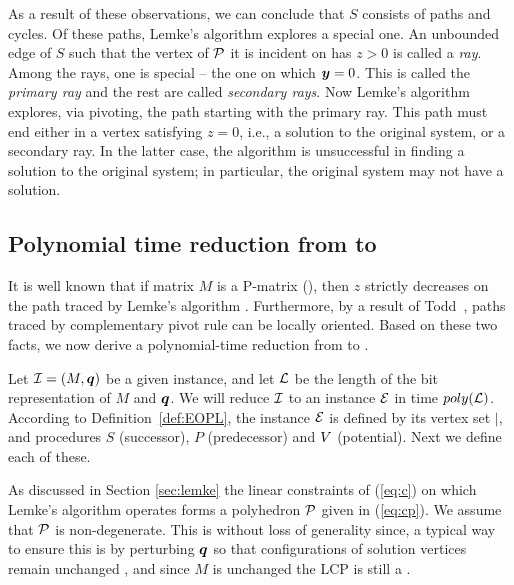 As a result of these observations, we can conclude that $S$ consists of paths and cycles.  Of these paths, Lemke's algorithm
explores a special one.  An unbounded edge of $S$ such that the vertex of $\mbox{${\mathcal P}$}$ it is incident on has $z > 0$ is called a
{\em ray}.  Among the rays, one is special -- the one on which $\mbox{\boldmath $y$} = 0$. This is called the {\em primary ray} and the rest
are called {\em secondary rays}. Now Lemke's algorithm explores, via pivoting, the path starting with the primary ray. This
path must end either in a vertex satisfying $z = 0$, i.e., a solution to the original system, or a secondary ray. In the
latter case, the algorithm is unsuccessful in finding a solution to the original system; in particular, the original system
may not have a solution.  

\subsection{Polynomial time reduction from \PLCP to \EOPL}

It is well known that if matrix $M$ is a P-matrix (\PLCP), then $z$ strictly
decreases on the path traced by Lemke's algorithm \cite{cottle2009linear}.
Furthermore, by a result of Todd~\cite[Section 5]{todd1976orientation}, paths traced by
complementary pivot rule can be locally oriented.  Based on these two facts, 
we now derive a polynomial-time reduction from \PLCP to \EOPL.

Let $\mbox{${\mathcal I}$}=(M,\mbox{\boldmath $q$})$ be a given \PLCP instance, and let $\mbox{${\mathcal L}$}$ be the length of the 
bit representation of $M$ and $\mbox{\boldmath $q$}$. 
We will reduce $\mbox{${\mathcal I}$}$ to an \EOPL instance $\mbox{${\mathcal E}$}$ in time $poly(\mbox{${\mathcal L}$})$. 
According to Definition~\ref{def:EOPL}, the instance $\mbox{${\mathcal E}$}$ is defined 
by its vertex set $\vert$, and procedures $S$ (successor), $P$ (predecessor) and $\mbox{$V$}$ (potential). 
Next we define each of these. 

As discussed in Section \ref{sec:lemke} the linear constraints of (\ref{eq:c})
on which Lemke's algorithm operates forms a polyhedron $\mbox{${\mathcal P}$}$ given in
(\ref{eq:cp}). We assume that $\mbox{${\mathcal P}$}$ is non-degenerate. This is without
loss of generality since, a typical way to ensure this is by perturbing $\mbox{\boldmath $q$}$ so
that configurations of solution vertices remain unchanged
\cite{cottle2009linear}, and since $M$ is unchanged the LCP is still a \PLCP. 

